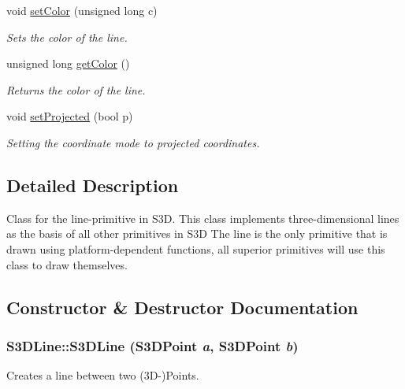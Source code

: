 \begin{DoxyCompactItemize}
void \hyperlink{class_s3_d_line_a9feaf056477e858a7b0248a7b5cdd222}{setColor} (unsigned long c)
\begin{DoxyCompactList}\small\item\em Sets the color of the line. \item\end{DoxyCompactList}\item 
unsigned long \hyperlink{class_s3_d_line_a62b49873ae3356cf997ca1fd87a1b7de}{getColor} ()
\begin{DoxyCompactList}\small\item\em Returns the color of the line. \item\end{DoxyCompactList}\item 
void \hyperlink{class_s3_d_line_a3b973e5206d4bed73b797b4c5afe8dec}{setProjected} (bool p)
\begin{DoxyCompactList}\small\item\em Setting the coordinate mode to projected coordinates. \item\end{DoxyCompactList}\end{DoxyCompactItemize}


\subsection{Detailed Description}
Class for the line-\/primitive in S3D. This class implements three-\/dimensional lines as the basis of all other primitives in S3D The line is the only primitive that is drawn using platform-\/dependent functions, all superior primitives will use this class to draw themselves. 

\subsection{Constructor \& Destructor Documentation}
\hypertarget{class_s3_d_line_ae6eeda40b82f27193b1d1165a8fb3e63}{
\subsubsection[{S3DLine}]{\setlength{\rightskip}{0pt plus 5cm}S3DLine::S3DLine ({\bf S3DPoint} {\em a}, \/  {\bf S3DPoint} {\em b})}}
\label{class_s3_d_line_ae6eeda40b82f27193b1d1165a8fb3e63}


Creates a line between two (3D-\/)Points. 


